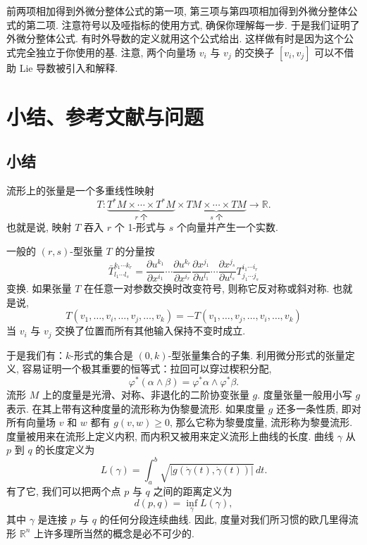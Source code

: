 前两项相加得到外微分整体公式的第一项, 第三项与第四项相加得到外微分整体公式的第二项. 注意符号以及哑指标的使用方式, 确保你理解每一步. 于是我们证明了外微分整体公式. 有时外导数的定义就用这个公式给出. 这样做有时是因为这个公式完全独立于你使用的基. 注意, 两个向量场 $v_i$ 与 $v_j$ 的交换子 $[v_i,v_j]$ 可以不借助 Lie 导数被引入和解释.

\section{小结、参考文献与问题}

\subsection{小结}

流形上的张量是一个多重线性映射
\[
T:\underbrace{T^*M\times\cdots\times T^*M}_{r\text{ 个}}\times\underbrace{TM\times\cdots\times TM}_{s\text{ 个}}\to\mathbb{R}.
\]
也就是说, 映射 $T$ 吞入 $r$ 个 1-形式与 $s$ 个向量并产生一个实数.
\begin{center}
\end{center}
\begin{center}
\end{center}
一般的 $(r,s)$-型张量 $T$ 的分量按
\[
\bar{T}^{k_1\cdots k_r}_{l_1\cdots l_s}
=\frac{\partial u^{k_1}}{\partial x^{i_1}}\cdots\frac{\partial u^{k_r}}{\partial x^{i_r}}
\frac{\partial x^{j_1}}{\partial u^{l_1}}\cdots\frac{\partial x^{j_s}}{\partial u^{l_s}}
T^{i_1\cdots i_r}_{j_1\cdots j_s}
\]
变换. 如果张量 $T$ 在任意一对参数交换时改变符号, 则称它反对称或斜对称. 也就是说, 
\[
T\left(v_1,\ldots,v_i,\ldots,v_j,\ldots,v_k\right)=-T\left(v_1,\ldots,v_j,\ldots,v_i,\ldots,v_k\right)
\]
当 $v_i$ 与 $v_j$ 交换了位置而所有其他输入保持不变时成立.
\begin{center}
\end{center}
于是我们有：$k$-形式的集合是 $(0,k)$-型张量集合的子集. 利用微分形式的张量定义, 容易证明一个极其重要的恒等式：拉回可以穿过楔积分配, 
\[
\varphi^*(\alpha\wedge\beta)=\varphi^*\alpha\wedge\varphi^*\beta.
\]
流形 $M$ 上的度量是光滑、对称、非退化的二阶协变张量 $g$. 度量张量一般用小写 $g$ 表示. 在其上带有这种度量的流形称为伪黎曼流形. 如果度量 $g$ 还多一条性质, 即对所有向量场 $v$ 和 $w$ 都有 $g(v,w)\geq0$, 那么它称为黎曼度量, 流形称为黎曼流形. 度量被用来在流形上定义内积, 而内积又被用来定义流形上曲线的长度. 曲线 $\gamma$ 从 $p$ 到 $q$ 的长度定义为
\[
L(\gamma)=\int_a^b\sqrt{\left|g\left(\dot{\gamma}(t),\dot{\gamma}(t)\right)\right|}\,dt.
\]
有了它, 我们可以把两个点 $p$ 与 $q$ 之间的距离定义为
\[
d(p,q)=\inf_{\gamma}L(\gamma),
\]
其中 $\gamma$ 是连接 $p$ 与 $q$ 的任何分段连续曲线. 因此, 度量对我们所习惯的欧几里得流形 $\mathbb{R}^n$ 上许多理所当然的概念是必不可少的.

